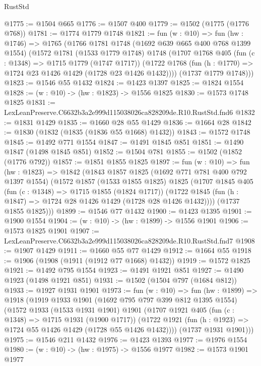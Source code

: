 \begin{lexlean}{RustStd}
\begin{coremodule}
@1775 := @1504 @665
@1776 := @1507 @400
@1779 := @1502 (@1775 (@1776 @768))
@1781 := @1774 @1779 @1748
@1821 := fun (w : @10) =>
  fun (hw : @1746) =>
  @1765
    (@1766
      @1781
      @1748
      (@1692 @639 @665 @400 @768 @1399 @1554)
      (@1572
        @1781
        (@1533 @1779 @1748)
        @1748
        (@1707
          @1768
          @405
          (fun (c : @1348) => @1715 @1779 (@1747 @1717))
          (@1722 @1768 (fun (h : @1770) => @1724 @23 @1426 @1429 (@1728 @23 @1426 @1432))))
        (@1737 @1779 @1748)))
@1823 := @1546 @55 @1432
@1824 := @1423 @1397
@1825 := @1824 @1554
@1828 := (w : @10) -> (hw : @1823) -> @1556 @1825
@1830 := @1573 @1748 @1825
@1831 := LexLeanPreserve.C6632b3a2e999d115038026ca828209de.R10.RustStd.fnd6
@1832 := @1831 @1429
@1835 := @1660 @28 @55 @1429
@1836 := @1664 @28
@1842 := @1830 (@1832 (@1835 (@1836 @55 @1668) @1432))
@1843 := @1572 @1748
@1845 := @1492 @771 @1554
@1847 := @1491 @1845 @851
@1851 := @1490 @1847 (@1498 @1845 @851)
@1852 := @1504 @781
@1855 := @1502 (@1852 (@1776 @792))
@1857 := @1851 @1855 @1825
@1897 := fun (w : @10) =>
  fun (hw : @1823) =>
  @1842
    (@1843
      @1857
      @1825
      (@1692 @771 @781 @400 @792 @1397 @1554)
      (@1572
        @1857
        (@1533 @1855 @1825)
        @1825
        (@1707
          @1845
          @405
          (fun (c : @1348) => @1715 @1855 (@1824 @1717))
          (@1722 @1845 (fun (h : @1847) => @1724 @28 @1426 @1429 (@1728 @28 @1426 @1432))))
        (@1737 @1855 @1825)))
@1899 := @1546 @77 @1432
@1900 := @1423 @1395
@1901 := @1900 @1554
@1904 := (w : @10) -> (hw : @1899) -> @1556 @1901
@1906 := @1573 @1825 @1901
@1907 := LexLeanPreserve.C6632b3a2e999d115038026ca828209de.R10.RustStd.fnd7
@1908 := @1907 @1429
@1911 := @1660 @55 @77 @1429
@1912 := @1664 @55
@1918 := @1906 (@1908 (@1911 (@1912 @77 @1668) @1432))
@1919 := @1572 @1825
@1921 := @1492 @795 @1554
@1923 := @1491 @1921 @851
@1927 := @1490 @1923 (@1498 @1921 @851)
@1931 := @1502 (@1504 @797 (@1684 @812))
@1933 := @1927 @1931 @1901
@1973 := fun (w : @10) =>
  fun (hw : @1899) =>
  @1918
    (@1919
      @1933
      @1901
      (@1692 @795 @797 @399 @812 @1395 @1554)
      (@1572
        @1933
        (@1533 @1931 @1901)
        @1901
        (@1707
          @1921
          @405
          (fun (c : @1348) => @1715 @1931 (@1900 @1717))
          (@1722 @1921 (fun (h : @1923) => @1724 @55 @1426 @1429 (@1728 @55 @1426 @1432))))
        (@1737 @1931 @1901)))
@1975 := @1546 @211 @1432
@1976 := @1423 @1393
@1977 := @1976 @1554
@1980 := (w : @10) -> (hw : @1975) -> @1556 @1977
@1982 := @1573 @1901 @1977

\end{coremodule}
\end{lexlean}
